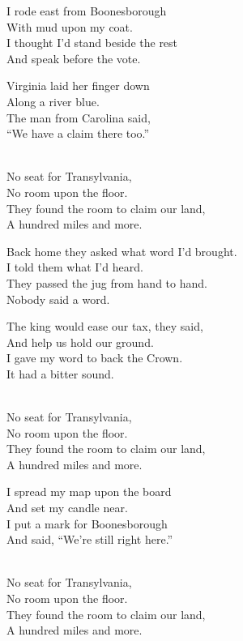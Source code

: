 \begin{lyrics}
I rode east from Boonesborough\\
With mud upon my coat.\\
I thought I’d stand beside the rest\\
And speak before the vote.

Virginia laid her finger down\\
Along a river blue.\\
The man from Carolina said,\\
“We have a claim there too.”

\\
No seat for Transylvania,\\
No room upon the floor.\\
They found the room to claim our land,\\
A hundred miles and more.


Back home they asked what word I’d brought.\\
I told them what I’d heard.\\
They passed the jug from hand to hand.\\
Nobody said a word.

The king would ease our tax, they said,\\
And help us hold our ground.\\
I gave my word to back the Crown.\\
It had a bitter sound.

\\
No seat for Transylvania,\\
No room upon the floor.\\
They found the room to claim our land,\\
A hundred miles and more.


I spread my map upon the board\\
And set my candle near.\\
I put a mark for Boonesborough\\
And said, “We’re still right here.”

\\
No seat for Transylvania,\\
No room upon the floor.\\
They found the room to claim our land,\\
A hundred miles and more.
\end{lyrics}

